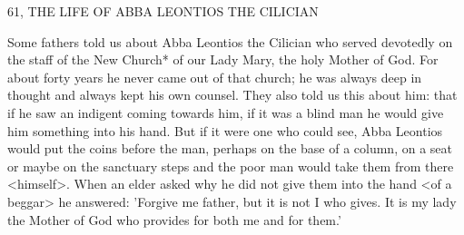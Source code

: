 61, THE LIFE OF ABBA LEONTIOS THE CILICIAN

Some fathers told us about Abba Leontios the Cilician who served
devotedly on the staff of the New Church* of our Lady Mary, the
holy Mother of God.
For about forty years he never came out of
that church; he was always deep in thought and always kept his
own counsel.
They also told us this about him: that if he saw an
indigent coming towards him, if it was a blind man he would give
him something into his hand.
But if it were one who could see,
Abba Leontios would put the coins before the man, perhaps on the
base of a column, on a seat or maybe on the sanctuary steps and
the poor man would take them from there <himself>.
When an
elder asked why he did not give them into the hand <of a beggar>
he answered: 'Forgive me father, but it is not I who gives.
It is my
lady the Mother of God who provides for both me and for them.'

